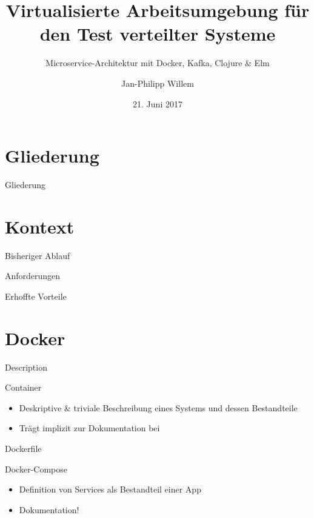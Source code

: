 \documentclass[compress]{beamer}
\title{Virtualisierte Arbeitsumgebung für den Test verteilter Systeme}
\subtitle{Microservice-Architektur mit Docker, Kafka, Clojure \& Elm}
\author{Jan-Philipp Willem}
\institute{Fakultät für Informatik\\Hochschule Mannheim}
\date{21. Juni 2017}
\begin{document}

\maketitle


\section*{Gliederung}
\begin{frame}{Gliederung}
  \tableofcontents[hideallsubsections]
\end{frame}

\section{Kontext}
\begin{frame}{Bisheriger Ablauf}
\end{frame}
\begin{frame}{Anforderungen}
\end{frame}
\begin{frame}{Erhoffte Vorteile}
\end{frame}

\section{Docker}
\begin{frame}{Description}
\end{frame}
\begin{frame}{Container}
  \begin{itemize}
    \item Deskriptive \& triviale Beschreibung eines Systems und dessen Bestandteile
    \item Trägt implizit zur Dokumentation bei
  \end{itemize}
\end{frame}
\begin{frame}{Dockerfile}
\end{frame}
\begin{frame}{Docker-Compose}
  \begin{itemize}
    \item Definition von Services als Bestandteil einer App
    \item Dokumentation!
  \end{itemize}
\end{frame}
\end{document}
